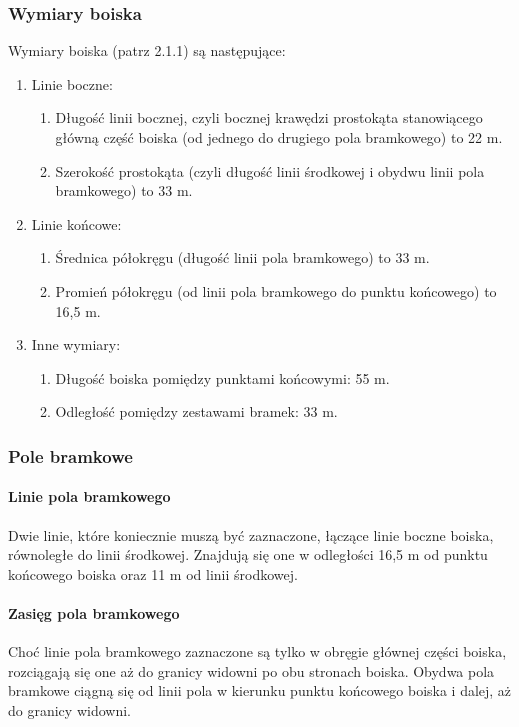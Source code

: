\documentclass[12pt]{article}
\begin{document}
\subsubsection{Wymiary boiska}
Wymiary boiska (patrz 2.1.1) są następujące:
\begin{enumerate}
\item{Linie boczne:}
  \begin{enumerate}
  \item Długość linii bocznej, czyli bocznej krawędzi prostokąta stanowiącego
  główną część boiska (od jednego do drugiego pola bramkowego) to 22 m.

  \item Szerokość prostokąta (czyli długość linii środkowej i obydwu linii
  pola bramkowego) to 33 m.
  \end{enumerate}
\item{Linie końcowe:}
  \begin{enumerate}
  \item Średnica półokręgu (długość linii pola bramkowego) to 33 m.

  \item Promień półokręgu (od linii pola bramkowego do punktu końcowego) to
  16,5 m.
  \end{enumerate}
\item{Inne wymiary:}
  \begin{enumerate}
  \item Długość boiska pomiędzy punktami końcowymi: 55 m.

  \item Odległość pomiędzy zestawami bramek: 33 m.
  \end{enumerate}
\end{enumerate}

\subsubsection{Pole bramkowe}
\paragraph{Linie pola bramkowego}
Dwie linie, które koniecznie
muszą być zaznaczone, łączące linie boczne boiska, równoległe do linii
środkowej. Znajdują się one w odległości 16,5 m od punktu końcowego
boiska oraz 11 m od linii środkowej.

\paragraph{Zasięg pola bramkowego}
Choć linie pola bramkowego
zaznaczone są tylko w obręgie głównej części boiska, rozciągają się one
aż do granicy widowni po obu stronach boiska. Obydwa pola bramkowe
ciągną się od linii pola w kierunku punktu końcowego boiska i dalej, aż
do granicy widowni.
\end{document}
